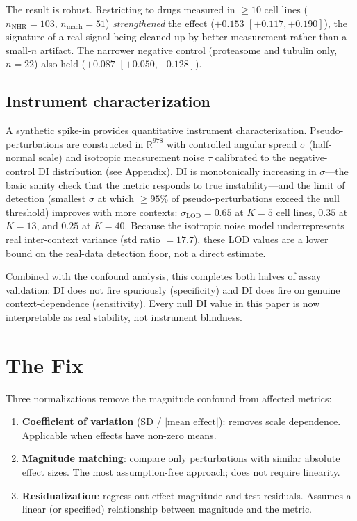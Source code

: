 \documentclass[11pt]{article}
\begin{document}
The result is robust. Restricting to drugs measured in $\geq 10$ cell
lines ($n_{\text{NHR}} = 103$, $n_{\text{mach}} = 51$) \emph{strengthened}
the effect ($+0.153$ $[+0.117, +0.190]$), the signature of a real signal
being cleaned up by better measurement rather than a small-$n$ artifact.
The narrower negative control (proteasome and tubulin only, $n = 22$)
also held ($+0.087$ $[+0.050, +0.128]$).

\subsection{Instrument characterization}

A synthetic spike-in provides quantitative instrument characterization.
Pseudo-perturbations are constructed in $\mathbb{R}^{978}$ with
controlled angular spread $\sigma$ (half-normal scale) and isotropic
measurement noise $\tau$ calibrated to the negative-control DI
distribution (see Appendix). DI is monotonically increasing in
$\sigma$---the basic sanity check that the metric responds to true
instability---and the limit of detection (smallest $\sigma$ at which
$\geq 95\%$ of pseudo-perturbations exceed the null threshold) improves
with more contexts: $\sigma_{\text{LOD}} = 0.65$ at $K = 5$ cell lines,
$0.35$ at $K = 13$, and $0.25$ at $K = 40$. Because the isotropic
noise model underrepresents real inter-context variance (std ratio $=
17.7$), these LOD values are a lower bound on the real-data detection
floor, not a direct estimate.

Combined with the confound analysis, this completes both halves of
assay validation: DI does not fire spuriously (specificity) and DI does
fire on genuine context-dependence (sensitivity). Every null DI value
in this paper is now interpretable as real stability, not instrument
blindness.


\section{The Fix}

Three normalizations remove the magnitude confound from affected
metrics:

\begin{enumerate}
  \item \textbf{Coefficient of variation} (SD / $|\text{mean effect}|$):
    removes scale dependence. Applicable when effects have non-zero means.
  \item \textbf{Magnitude matching}: compare only perturbations with
    similar absolute effect sizes. The most assumption-free approach; does
    not require linearity.
  \item \textbf{Residualization}: regress out effect magnitude and test
    residuals. Assumes a linear (or specified) relationship between
    magnitude and the metric.
\end{enumerate}
\end{document}
